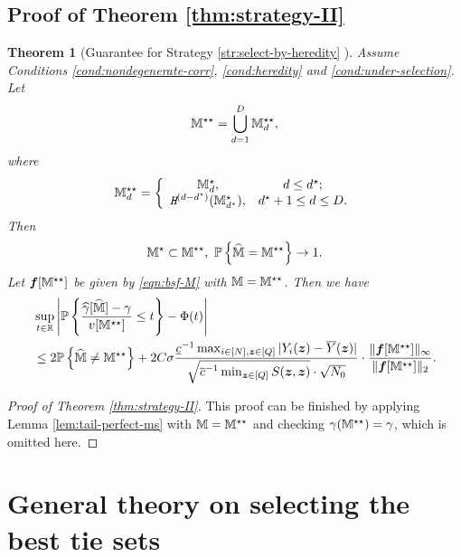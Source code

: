 \documentclass[12pt]{article}
\newtheorem{theorem}{Theorem}
\begin{document}
\subsection{Proof of Theorem \ref{thm:strategy-II}}
\begin{theorem}[Guarantee for Strategy \ref{str:select-by-heredity} ] 
Assume Conditions \ref{cond:nondegenerate-corr}, \ref{cond:heredity} and \ref{cond:under-selection}. Let 
\begin{align*}
    {\mathbb{M}}^{\star\star} = \bigcup_{d=1}^D {\mathbb{M}}^{\star\star}_d,
\end{align*}
where
\begin{align*}
    {\mathbb{M}}^{\star\star}_d = \left\{
    \begin{array}{cc}
        {\mathbb{M}}^{\star}_d, & d\le d^\star; \\
        \texttt{\em H}^{(d-d^\star)}({\mathbb{M}}^{\star}_{d^\star}), & d^\star+1\le d\le D.
    \end{array}
    \right.
\end{align*}
Then 
\begin{align*}
    {\mathbb{M}}^\star \subset {\mathbb{M}}^{\star\star},~ {{\mathbb{P}}\left\{\widehat{{\mathbb{M}}} = {\mathbb{M}}^{\star\star}\right\}} \to 1.
\end{align*}
Let $ {{\boldsymbol{f}}}[{\mathbb{M}}^{\star\star}]$ be given by \eqref{eqn:bsf-M} with ${\mathbb{M}} = {\mathbb{M}}^{\star\star} $. 
Then we have
\begin{align}\label{eqn:tail-over-ms-app}
    &\sup_{t\in{\mathbb{R}}}\left|{{\mathbb{P}}\left\{\frac{{\widehat{\gamma}}[\widehat{{\mathbb{M}}}]-\gamma}{v[{\mathbb{M}}^{\star\star}]} \le t\right\}} - \Phi(t)\right| \notag\\
    &\le 2{{\mathbb{P}}\left\{\widehat{{\mathbb{M}}}\neq {\mathbb{M}}^{\star\star}\right\}} +  2C\sigma   \frac{\underline{c}^{-1} \max_{i\in[N],{\boldsymbol{z}}\in[Q]}|Y_i({\boldsymbol{z}})-\overline{Y}({\boldsymbol{z}})|}{\sqrt{\overline{c}^{-1} \min_{{\boldsymbol{z}}\in[Q]} S({\boldsymbol{z}},{\boldsymbol{z}})}\cdot \sqrt{N_0}}\cdot  \frac{\|{{\boldsymbol{f}}}[{\mathbb{M}}^{\star\star}]\|_\infty}{\|{{\boldsymbol{f}}}[{\mathbb{M}}^{\star\star}]\|_2} .
\end{align}


\end{theorem}


\begin{proof}[Proof of Theorem \ref{thm:strategy-II}]
This proof can be finished by applying Lemma \ref{lem:tail-perfect-ms} with ${\mathbb{M}}={\mathbb{M}}^{\star\star}$ and checking $\gamma({\mathbb{M}}^{\star\star}) = \gamma$, which is omitted here. 
\end{proof}





\section{General theory on selecting the best tie sets}
\end{document}
